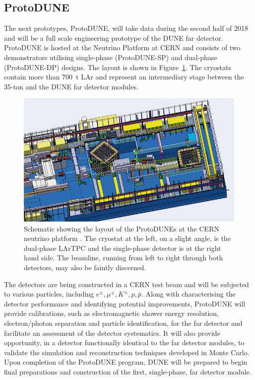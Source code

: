 \subsection{ProtoDUNE}\label{sec:ProtoDUNE}

The next prototypes, ProtoDUNE, will take data during the second half of 2018 and will be a full scale engineering prototype of the DUNE far detector.  ProtoDUNE is hosted at the Neutrino Platform at CERN and consists of two demonstrators utilising single-phase (ProtoDUNE-SP) \cite{ProtoDUNE-SP} and dual-phase (ProtoDUNE-DP) \cite{WA105} designs.  The layout is shown in Figure~\ref{fig:NeutrinoPlatform}.  The cryostats contain more than 700~t LAr and represent an intermediary stage between the 35-ton and the DUNE far detector modules.

\begin{figure}
  \centering
  \includegraphics[width=14cm]{NeutrinoPlatform.jpg}
  \caption[Schematic showing the layout of the ProtoDUNEs at the CERN neutrino platform.]{Schematic showing the layout of the ProtoDUNEs at the CERN neutrino platform \cite{NeutrinoPlatform}.  The cryostat at the left, on a slight angle, is the dual-phase LArTPC and the single-phase detector is at the right hand side.  The beamline, running from left to right through both detectors, may also be faintly discerned.}
  \label{fig:NeutrinoPlatform}
\end{figure}

The detectors are being constructed in a CERN test beam and will be subjected to various particles, including $e^{\pm}, \mu^{\pm}, K^{\pm}, p, \bar{p}$.  Along with characterising the detector performance and identifying potential improvements, ProtoDUNE will provide calibrations, such as electromagnetic shower energy resolution, electron/photon separation and particle identification, for the far detector and facilitate an assessment of the detector systematics.  It will also provide opportunity, in a detector functionally identical to the far detector modules, to validate the simulation and reconstruction techniques developed in Monte Carlo.  Upon completion of the ProtoDUNE program, DUNE will be prepared to begin final preparations and construction of the first, single-phase, far detector module.

